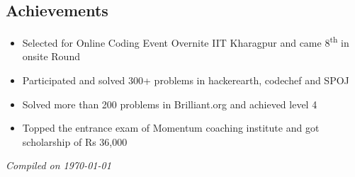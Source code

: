\documentclass[margin,line]{resume}
\begin{document}
\begin{resume}

    \section{\mysidestyle Achievements}
    \begin{itemize}
	        \item Selected for Online Coding Event Overnite IIT Kharagpur and came 8​\textsuperscript{th}​ in onsite Round
	        \item Participated and solved 300+ problems in hackerearth, codechef and SPOJ
	        \item Solved more than 200 problems in Brilliant.org and achieved level 4
	        \item Topped the entrance exam of Momentum coaching institute and got scholarship of Rs 36,000
   \end{itemize}

\hfill \textsl{Compiled on \monthyeardate\today}

\end{resume}
\end{document}
